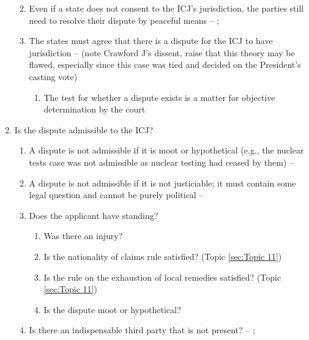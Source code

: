 \begin{enumerate}
\begin{enumerate}
\begin{enumerate}
        \end{enumerate}
        \item Even if a state does not consent to the ICJ's jurisdiction, the parties still need to resolve their dispute by peaceful means -- ; 
        \item The states must agree that there is a dispute for the ICJ to have jurisdiction --  (note Crawford J's dissent, raise that this theory may be flawed, especially since this case was tied and decided on the President's casting vote)
        \begin{enumerate}
            \item The test for whether a dispute exists is a matter for objective determination by the court
        \end{enumerate}
    \end{enumerate}
    \item Is the dispute admissible to the ICJ?
    \begin{enumerate}
        \item A dispute is not admissible if it is moot or hypothetical (e.g., the nuclear tests case was not admissible as nuclear testing had ceased by them) -- 
        \item A dispute is not admissible if it is not justiciable; it must contain some legal question and cannot be purely political -- 
        \item Does the applicant have standing?
        \begin{enumerate}
            \item Was there an injury?
            \item Is the nationality of claims rule satisfied? (Topic \ref{sec:Topic 11})
            \item Is the rule on the exhaustion of local remedies satisfied? (Topic \ref{sec:Topic 11})
            \item Is the dispute moot or hypothetical?
        \end{enumerate}
        \item Is there an indispensable third party that is not present? -- ; 

\end{enumerate}
\end{enumerate}
